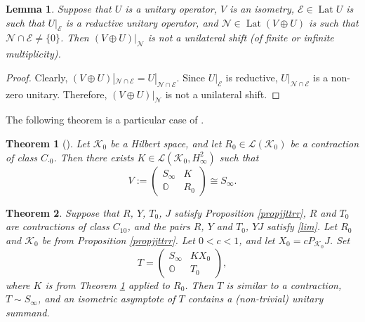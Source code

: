\documentclass[a4paper,oneside,11pt]{amsart}
\numberwithin{equation}{section}
\theoremstyle{plain}
\newtheorem{theorem}{Theorem}[section]
\newtheorem{lemma}[theorem]{Lemma}
\newtheorem{theoremcite}{Theorem}
\theoremstyle{definition}
\begin{document}
\begin{lemma}\label{lemnnee} Suppose that $U$ is a unitary operator, $V$ is an isometry,  
$\mathcal E\in \operatorname{Lat}U$ is such that $U|_{\mathcal E}$ is a reductive unitary operator, and  
$\mathcal N\in \operatorname{Lat}(V\oplus U)$ is such that $\mathcal N\cap\mathcal E\neq\{0\}$. 
Then $ (V\oplus U)|_{\mathcal N}$ is not a unilateral shift  (of finite or infinite multiplicity).
\end{lemma}

\begin{proof} Clearly,  $(V\oplus U)|_{\mathcal N\cap\mathcal E}=U|_{\mathcal N\cap\mathcal E}$.  
Since $U|_{\mathcal E}$ is  reductive,  $U|_{\mathcal N\cap\mathcal E}$  is a non-zero unitary. Therefore, 
$ (V\oplus U)|_{\mathcal N}$ is not a unilateral shift. 
\end{proof}

The following theorem is a particular case of {\cite[Theorem VI.2.3]{nfbk}}.

\begin{theoremcite}[{\cite[Theorem VI.2.3]{nfbk}}]\label{thmnfbk} Let $\mathcal K_0$ be a Hilbert space, and let 
$R_0\in\mathcal L(\mathcal K_0)$ be a contraction of class $C_{\cdot 0}$. Then there exists 
$K\in\mathcal L(\mathcal K_0,H^2_\infty)$ 
such that 
\begin{equation}\label{congss}V:=\begin{pmatrix}S_\infty & K\\ \mathbb O& R_0\end{pmatrix}\cong S_\infty.\end{equation}
\end{theoremcite}

\begin{theorem}\label{thm5}
Suppose that $R$, $Y$, $T_0$, $J$ satisfy Proposition \ref{propjjttrr},  $R$ and $T_0$ are contractions  of class 
 $C_{10}$, 
and the pairs $R$, $Y$ and $T_0$, $YJ$ satisfy \eqref{lim}. 
Let  $R_0$ and $\mathcal K_0$ be from Proposition \ref{propjjttrr}. Let $0<c<1$,  and let   $X_0=cP_{\mathcal K_0}J$. 
Set $$T=\begin{pmatrix}S_\infty & KX_0\\ \mathbb O& T_0\end{pmatrix},$$
where $K$ is from Theorem \ref{thmnfbk} applied to $R_0$. Then $T$ is similar to a contraction, $T\sim S_\infty$, and 
 an isometric asymptote of $T$ contains  a (non-trivial) unitary summand. \end{theorem}
\end{document}
